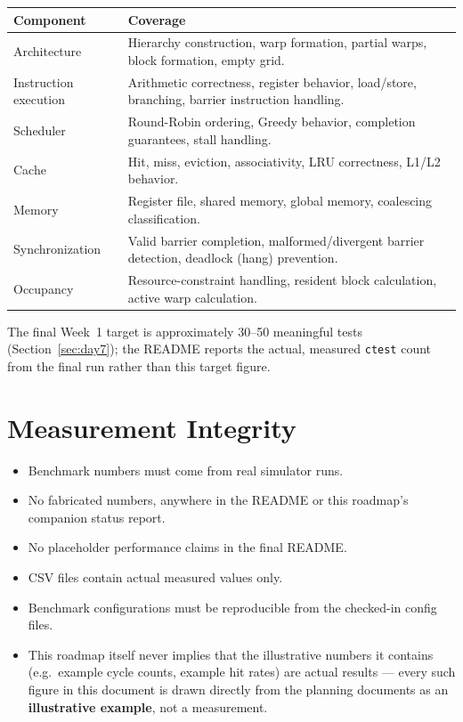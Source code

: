 \documentclass[11pt]{article}
\begin{document}
\begin{longtable}{@{}p{3.2cm}p{11.3cm}@{}}
\toprule
\textbf{Component} & \textbf{Coverage} \\
\midrule
\endhead
Architecture & Hierarchy construction, warp formation, partial warps,
block formation, empty grid. \\
Instruction execution & Arithmetic correctness, register behavior,
load/store, branching, barrier instruction handling. \\
Scheduler & Round-Robin ordering, Greedy behavior, completion guarantees,
stall handling. \\
Cache & Hit, miss, eviction, associativity, LRU correctness, L1/L2
behavior. \\
Memory & Register file, shared memory, global memory, coalescing
classification. \\
Synchronization & Valid barrier completion, malformed/divergent barrier
detection, deadlock (hang) prevention. \\
Occupancy & Resource-constraint handling, resident block calculation,
active warp calculation. \\
\bottomrule
\end{longtable}

The final Week~1 target is approximately 30--50 meaningful tests
(Section~\ref{sec:day7}); the README reports the actual, measured \texttt{ctest}
count from the final run rather than this target figure.

\section{Measurement Integrity}
\label{sec:measurement-integrity}

\begin{itemize}[leftmargin=1.2cm]
  \item Benchmark numbers must come from real simulator runs.
  \item No fabricated numbers, anywhere in the README or this roadmap's
  companion status report.
  \item No placeholder performance claims in the final README.
  \item CSV files contain actual measured values only.
  \item Benchmark configurations must be reproducible from the checked-in
  config files.
  \item This roadmap itself never implies that the illustrative numbers it
  contains (e.g.\ example cycle counts, example hit rates) are actual
  results --- every such figure in this document is drawn directly from
  the planning documents as an \textbf{illustrative example}, not a
  measurement.
\end{itemize}
\end{document}
